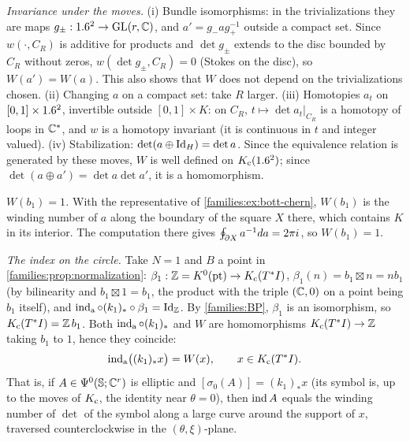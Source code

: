 \emph{Invariance under the moves.} (i) Bundle isomorphisms: in the trivializations they
are maps $g_\pm:1.6^2\to\operatorname{GL}(r,\mathbb{C})$, and $a'=g_-ag_+^{-1}$ outside a compact set. Since
$w(\cdot,C_R)$ is additive for products and $\det g_\pm$ extends to the disc bounded by
$C_R$ without zeros, $w(\det g_\pm,C_R)=0$ (Stokes on the disc), so $W(a')=W(a)$. This also
shows that $W$ does not depend on the trivializations chosen. (ii) Changing $a$ on a compact
set: take $R$ larger. (iii) Homotopies $a_t$ on $[0,1]\times1.6^2$, invertible outside
$[0,1]\times K$: on $C_R$, $t\mapsto\det a_t|_{C_R}$ is a homotopy of loops in $\mathbb{C}^*$, and
$w$ is a homotopy invariant (it is continuous in $t$ and integer valued). (iv) Stabilization:
$\det(a\oplus\operatorname{Id}_H)=\det a$. Since the equivalence relation is generated by these moves, $W$
is well defined on $K_{\mathrm{c}}(1.6^2)$; since $\det(a\oplus a')=\det a\det a'$, it is a
homomorphism.

\emph{$W(b_1)=1$.} With the representative of \cref{families:ex:bott-chern}, $W(b_1)$ is
the winding number of $a$ along the boundary of the square $X$ there, which contains $K$ in
its interior. The computation there gives $\oint_{\partial X}a^{-1}da=2\pi i$, so $W(b_1)=1$.

\emph{The index on the circle.} Take $N=1$ and $B$ a point in
\cref{families:prop:normalization}: $\beta_1:\mathbb{Z}=K^0(\text{pt})\to K_{\mathrm{c}}(T^*I)$,
$\beta_1(n)=b_1\boxtimes n=nb_1$ (by bilinearity and $b_1\boxtimes1=b_1$, the product
with the triple $(\mathbb{C},0)$ on a point being $b_1$ itself), and
$\operatorname{ind}_{\mathrm{a}}\circ(k_1)_*\circ\beta_1=\operatorname{Id}_{\mathbb{Z}}$. By \ref{families:BP}, $\beta_1$ is an
isomorphism, so $K_{\mathrm{c}}(T^*I)=\mathbb{Z}\,b_1$. Both $\operatorname{ind}_{\mathrm{a}}\circ(k_1)_*$ and $W$ are homomorphisms
$K_{\mathrm{c}}(T^*I)\to\mathbb{Z}$ taking $b_1$ to $1$, hence they coincide:
\begin{equation*}
\operatorname{ind}_{\mathrm{a}}\bigl((k_1)_*x\bigr)=W(x),\qquad x\in K_{\mathrm{c}}(T^*I).
\end{equation*}
That is, if $A\in\Psi^{0}(\mathbb{S};\mathbb{C}^r)$ is elliptic and $[\sigma_0(A)]=(k_1)_*x$ (its symbol
is, up to the moves of $K_{\mathrm{c}}$, the identity near $\theta=0$), then $\operatorname{ind} A$ equals the
winding number of $\det$ of the symbol along a large curve around the support of $x$,
traversed counterclockwise in the $(\theta,\xi)$-plane.
